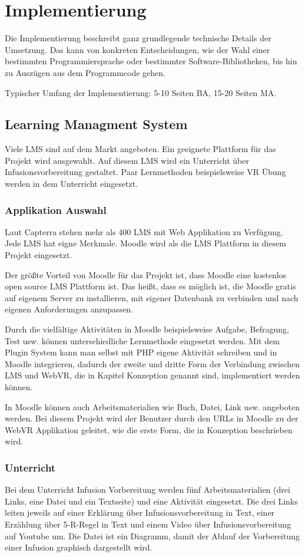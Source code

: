 \chapter{Implementierung}

Die Implementierung beschreibt ganz grundlegende technische Details der Umsetzung. Das kann von konkreten Entscheidungen, wie der Wahl einer bestimmten Programmiersprache oder bestimmter Software-Bibliotheken, bis hin zu Auszügen aus dem Programmcode gehen.

Typischer Umfang der Implementierung: 5-10 Seiten BA, 15-20 Seiten MA.

\section{Learning Managment System}
Viele LMS sind auf dem Markt angeboten. Ein geeignete Plattform für das Projekt wird ausgewahlt. Auf diesem LMS wird ein Unterricht über Infusionsvorbereitung gestaltet. Paar Lernmethoden beispielsweise VR Übung werden in dem Unterricht eingesetzt. 

 \subsection{Applikation Auswahl}
 Laut Capterra stehen mehr als 400 LMS mit Web Applikation zu Verfügung. Jede LMS hat eigne Merkmale. Moodle wird als die LMS Plattform in diesem Projekt eingesetzt.
 
 Der größte Vorteil von Moodle für das Projekt ist, dass Moodle eine kostenlos open source LMS Plattform ist. Das heißt, dass es möglich ist, die Moodle gratis auf eigenem Server zu installieren, mit eigener Datenbank zu verbinden und nach eigenen Anforderungen anzupassen.
 
 Durch die vielfältige Aktivitäten in Moodle beispielsweise Aufgabe, Befragung, Test usw. können unterschiedliche Lernmethode eingesetzt werden. Mit dem Plugin System kann man selbst mit PHP eigene Aktivität schreiben und in Moodle integrieren, dadurch der zweite und dritte Form der Verbindung zwischen LMS und WebVR, die in Kapitel Konzeption genannt sind, implementiert werden können.
 
 In Moodle können auch Arbeitsmaterialien wie Buch, Datei, Link usw. angeboten werden. Bei diesem Projekt wird der Benutzer durch den URLs in Moodle zu der WebVR Applikation geleitet, wie die erste Form, die in Konzeption beschrieben wird. 
 
 \subsection{Unterricht}
 Bei dem Unterricht Infusion Vorbereitung werden fünf Arbeitsmaterialien (drei Links, eine Datei und ein Textseite) und eine Aktivität eingesetzt. Die drei Links leiten jeweils auf einer Erklärung über Infusionsvorbereitung in Text, einer Erzählung über 5-R-Regel in Text und einem Video über Infusionsvorbereitung auf Youtube um. Die Datei ist ein Diagramm, damit der Ablauf der Vorbereitung einer Infusion graphisch dargestellt wird.
 

